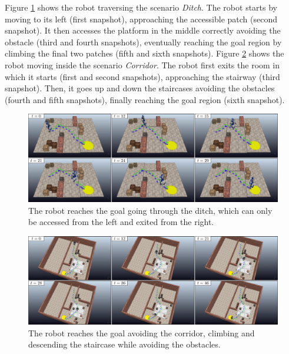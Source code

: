 Figure \ref{fig:WoS:offlineCase:Ditch:Snapshots} shows the robot traversing the
scenario \textit{Ditch}. The robot starts by moving to its left (first
snapshot), approaching the accessible patch (second snapshot). It then accesses
the platform in the middle correctly avoiding the obstacle (third and fourth
snapshots), eventually reaching the goal region by climbing the final two
patches (fifth and sixth snapshots).
Figure \ref{fig:WoS:offlineCase:Corridor:Snapshots} shows the robot moving
inside the scenario \textit{Corridor}. The robot first exits the room in which
it starts (first and second snapshots), approaching the stairway (third
snapshot). Then, it goes up and down the staircases avoiding the obstacles
(fourth and fifth snapshots), finally reaching the goal region (sixth snapshot).

\begin{figure}
    \centering
    \includegraphics[width=\textwidth]{figures/OfflineDitch.png}
    \caption{The robot reaches the goal going through the ditch, which can only
        be accessed from the left and exited from the right.}
    \label{fig:WoS:offlineCase:Ditch:Snapshots}
\end{figure}
\begin{figure}
    \centering
    \includegraphics[width=\textwidth]{figures/OfflineCorridor.png}
    \caption{The robot reaches the goal avoiding the
    corridor, climbing and descending the staircase while
    avoiding the obstacles.}
    \label{fig:WoS:offlineCase:Corridor:Snapshots}
\end{figure}


